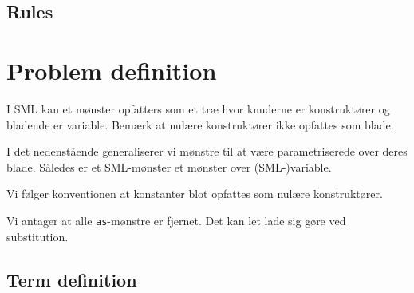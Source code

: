 \documentclass[oneside]{memoir}
\theoremstyle{definition}
\begin{document}
\subsection{Rules}





\section{Problem definition}

I SML kan et mønster opfatters som et træ hvor knuderne er konstruktører og
bladende er variable. Bemærk at nulære konstruktører ikke opfattes som blade.

I det nedenstående generaliserer vi mønstre til at være parametriserede over
deres blade. Således er et SML-mønster et mønster over (SML-)variable.

Vi følger konventionen at konstanter blot opfattes som nulære konstruktører.

Vi antager at alle \texttt{as}-mønstre er fjernet. Det kan let lade sig gøre ved
substitution.

\subsection{Term definition}
\label{sec:term-definition} 
\end{document}
